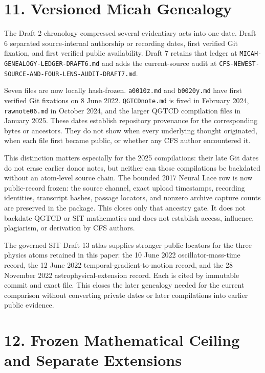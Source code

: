 \documentclass[
  american,
  11pt,
  letterpaper,
]{article}
\begin{document}
\section{11. Versioned Micah Genealogy}\label{versioned-micah-genealogy}

The Draft 2 chronology compressed several evidentiary acts into one date. Draft 6 separated source-internal authorship or recording dates, first verified Git fixation, and first verified public availability. Draft 7 retains that ledger at \nolinkurl{MICAH-GENEALOGY-LEDGER-DRAFT6.md} and adds the current-source audit at \nolinkurl{CFS-NEWEST-SOURCE-AND-FOUR-LENS-AUDIT-DRAFT7.md}.

Seven files are now locally hash-frozen. \texttt{a0010z.md} and \texttt{b0020y.md} have first verified Git fixations on 8 June 2022. \texttt{QGTCDnote.md} is fixed in February 2024, \texttt{rawnote06.md} in October 2024, and the larger QGTCD compilation files in January 2025. These dates establish repository provenance for the corresponding bytes or ancestors. They do not show when every underlying thought originated, when each file first became public, or whether any CFS author encountered it.

This distinction matters especially for the 2025 compilations: their late Git dates do not erase earlier donor notes, but neither can those compilations be backdated without an atom-level source chain. The bounded 2017 Neural Lace row is now public-record frozen: the source channel, exact upload timestamps, recording identities, transcript hashes, passage locators, and nonzero archive capture counts are preserved in the package. This closes only that ancestry gate. It does not backdate QGTCD or SIT mathematics and does not establish access, influence, plagiarism, or derivation by CFS authors.

The governed SIT Draft 13 atlas supplies stronger public locators for the three physics atoms retained in this paper: the 10 June 2022 oscillator-mass-time record, the 12 June 2022 temporal-gradient-to-motion record, and the 28 November 2022 astrophysical-extension record. Each is cited by immutable commit and exact file. This closes the later genealogy needed for the current comparison without converting private dates or later compilations into earlier public evidence.

\section{12. Frozen Mathematical Ceiling and Separate Extensions}\label{frozen-mathematical-ceiling-and-separate-extensions}
\end{document}
